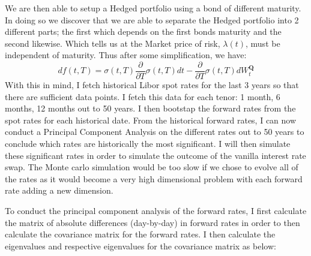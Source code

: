 \documentclass{report}
\theoremstyle{plain}
\theoremstyle{definition}
\begin{document}
We are then able to setup a Hedged portfolio using a bond of different maturity. In doing so we discover that we are able to separate the Hedged portfolio into 2 different parts; the first which depends on the first bonds maturity and the second likewise. Which tells us at the Market price of risk, $\lambda(t)$, must be independent of maturity. Thus after some simplification, we have:
\begin{equation}
	df(t,T) = \sigma(t,T)\frac{\partial}{\partial T}\sigma(t,T)dt - \frac{\partial }{\partial T}\sigma(t,T) dW_t^{\mathbf{Q}}
\label{HJM:riskfree}
\end{equation}
With this in mind, I fetch historical Libor spot rates for the last 3 years so that there are sufficient data points. I fetch this data for each tenor: 1 month, 6 months, 12 months out to 50 years. I then bootstap the forward rates from the spot rates for each historical date. From the historical forward rates, I can now conduct a Principal Component Analysis on the different rates out to 50 years to conclude which rates are historically the most significant. I will then simulate these significant rates in order to simulate the outcome of the vanilla interest rate swap. The Monte carlo simulation would be too slow if we chose to evolve all of the rates as it would become a very high dimensional problem with each forward rate adding a new dimension.

To conduct the principal component analysis of the forward rates, I first calculate the matrix of absolute differences (day-by-day) in forward rates in order to then calculate the covariance matrix for the forward rates. I then calculate the eigenvalues and respective eigenvalues for the covariance matrix as below:
\end{document}
